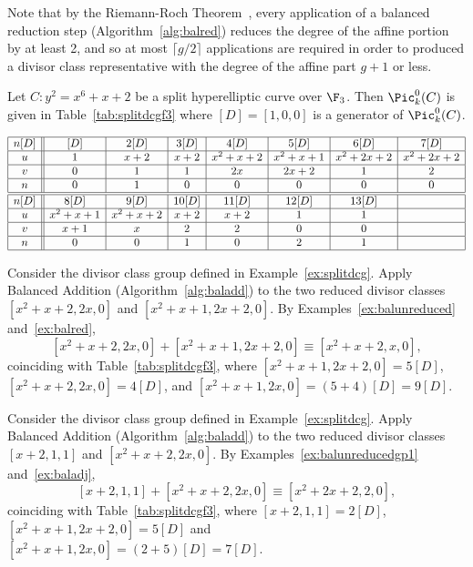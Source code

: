Note that by the Riemann-Roch Theorem~\cite[Section~8.7]{Galbraith_PKC_2012},
every application of a balanced reduction step (Algorithm~\ref{alg:balred})
reduces the degree of the affine portion by at least 2, and so at most $\lceil
g/2 \rceil$ applications are required in order to produced a divisor class
representative with the degree of the affine part $g+1$ or less.

\be\label{ex:splitdcg}
Let $C : y^2 = x^6 + x + 2$ be a split hyperelliptic curve over $\F_3$. Then
$\Pic^0_k(C)$ is given in Table~\ref{tab:splitdcgf3} where $[D] = [1,0,0]$ is
a generator of $\Pic^0_k(C)$.

\renewcommand{\arraycolsep}{4pt}
\begin{table}[ht]\label{tab:splitdcgf3}
\[ \begin{array}{|c||c|c|c|c|c|c|c|c|c|c|c|c|c|} 
\hline
n[D]&[D]&2[D]&3[D]&4[D]&5[D]&6[D]&7[D]\\\hline
u&1&x+2&x+2&x^2+x+2&x^2+x+1&x^2+2x+2&x^2+2x+2\\ \hline
v&0&1  &1  &2x     &2x+2   &1       &2       \\ \hline
n&0&1  &0  &0      &0      &0       &0       \\ \hline
\hline
n[D]&8[D]&9[D]&10[D]&11[D]&12[D]&13[D]&\\\hline
u&x^2+x+1&x^2+x+2&x+2&x+2&1&1&\\ \hline
v&x+1    &x      &2  &2  &0&0&\\ \hline
n&0      &0      &1  &0  &2&1&\\ \hline
\end{array} \]
\end{table}

\ee

\be
Consider the divisor class group defined in Example~\ref{ex:splitdcg}. Apply
Balanced Addition (Algorithm~\ref{alg:baladd}) to the two reduced divisor
classes $[x^2 + x + 2,2x,0]$ and $[x^2 + x + 1,2x + 2,0]$. By
Examples~\ref{ex:balunreduced} and~\ref{ex:balred}, $$[x^2 + x + 2,2x,0] + [x^2
+ x + 1,2x + 2,0] \equiv [x^2 + x + 2, x,0],$$ coinciding with
Table~\ref{tab:splitdcgf3}, where  $[x^2 + x + 1,2x + 2,0] = 5[D]$, $[x^2 + x
+ 2,2x,0] = 4[D]$, and  $[x^2 + x + 1, 2x, 0] = (5 + 4)[D] = 9[D]$.
\ee

\be
Consider the divisor class group defined in Example~\ref{ex:splitdcg}. Apply
Balanced Addition (Algorithm~\ref{alg:baladd}) to the two reduced divisor
classes $[x+2,1,1]$ and $[x^2 + x + 2,2x,0]$. By
Examples~\ref{ex:balunreducedgp1} and~\ref{ex:baladj}, $$[x+2,1,1] + [x^2 + x +
2,2x,0] \equiv [x^2 + 2x + 2, 2,0],$$ coinciding with
Table~\ref{tab:splitdcgf3}, where $[x + 2,1,1] = 2[D]$, $[x^2 + x + 1,2x +
2,0] = 5[D]$ and  $[x^2 + x + 1, 2x, 0] = (2 + 5)[D] = 7[D]$.
\ee

